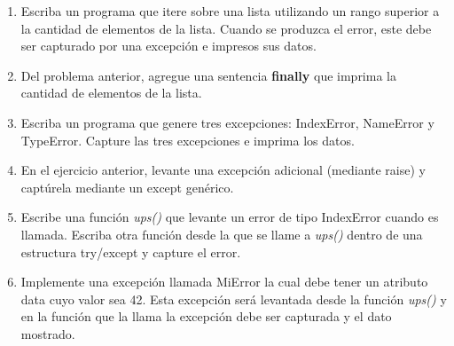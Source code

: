 \begin{enumerate}
\item Escriba un programa que itere sobre una lista utilizando un rango superior a la cantidad de elementos de la lista. Cuando se produzca el error, este debe ser capturado por una excepción e impresos sus datos.

\item Del problema anterior, agregue una sentencia \textbf{finally} que imprima la cantidad de elementos de la lista.

\item Escriba un programa que genere tres excepciones: IndexError, NameError y TypeError. Capture las tres excepciones e imprima los datos.

\item En el ejercicio anterior, levante una excepción adicional (mediante raise) y captúrela mediante un except genérico.

\item Escribe una función \textit{ups()} que levante un error de tipo IndexError cuando es llamada. Escriba otra función desde la que se llame a \textit{ups()} dentro de una estructura try/except y capture el error. 

\item Implemente una excepción llamada MiError la cual debe tener un atributo data cuyo valor sea 42. Esta excepción será levantada desde la función \textit{ups()} y en la función que la llama la excepción debe ser capturada y el dato mostrado.
\end{enumerate}

